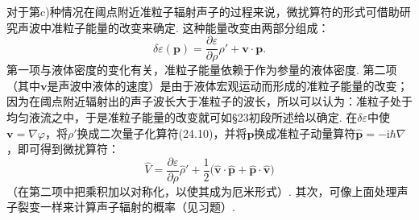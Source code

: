 对于第c)种情况在阈点附近准粒子辐射声子的过程来说，微扰算符的形式可借助研究声波中准粒子能量的改变来确定. 这种能量改变由两部分组成：
\begin{equation*}
\delta\varepsilon(\bm{p})=\frac{\partial\varepsilon}{\partial\rho}\rho'+\bm{v}\cdot\bm{p}.
\end{equation*}
第一项与液体密度的变化有关，准粒子能量依赖于作为参量的液体密度. 第二项（其中$\bm{v}$是声波中液体的速度）是由于液体宏观运动而形成的准粒子能量的改变；因为在阈点附近辐射出的声子波长大于准粒子的波长，所以可以认为：准粒子处于均匀液流之中，于是准粒子能量的改变就可如§23初段所述给以确定. 在$\delta\varepsilon$中使$\bm{v}=\nabla\varphi$，将$\rho'$换成二次量子化算符(24.10)，并将$\bm{p}$换成准粒子动量算符$\hat{\bm{p}}=-\mathrm{i}\hbar\nabla$，即可得到微扰算符：
\begin{equation}
\hat{V}=\frac{\partial\varepsilon}{\partial\rho}\hat{\rho}'
+\frac{1}{2}\big(\hat{\bm{v}}\cdot\hat{\bm{p}}+\hat{\bm{p}}\cdot\hat{\bm{v}}\big)
\label{34.11}
\end{equation}
（在第二项中把乘积加以对称化，以使其成为厄米形式）. 其次，可像上面处理声子裂变一样来计算声子辐射的概率（见习题）.

